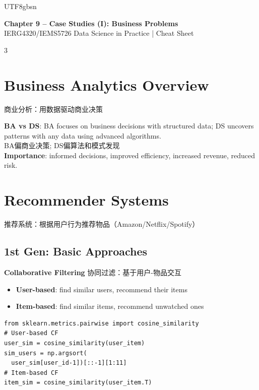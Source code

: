 \documentclass[9pt,landscape,a4paper]{article}
\newcommand{\zhint}[1]{{\scriptsize\color{gray!70!black}#1}}
\begin{document}
\begin{CJK}{UTF8}{gbsn}

\begin{center}
{\large\bfseries\color{blue!70!black} Chapter 9 -- Case Studies (I): Business Problems}\\
{\footnotesize IERG4320/IEMS5726 Data Science in Practice | Cheat Sheet}
\end{center}

\begin{multicols}{3}

\section{Business Analytics Overview}
\zhint{商业分析：用数据驱动商业决策}

\textbf{BA vs DS}: BA focuses on business decisions with structured data; DS uncovers patterns with any data using advanced algorithms.\\
\zhint{BA偏商业决策; DS偏算法和模式发现}\\
\textbf{Importance}: informed decisions, improved efficiency, increased revenue, reduced risk.

\section{Recommender Systems}
\zhint{推荐系统：根据用户行为推荐物品（Amazon/Netflix/Spotify）}

\subsection{1st Gen: Basic Approaches}

\textbf{Collaborative Filtering} \zhint{协同过滤：基于用户-物品交互}
\begin{itemize}[leftmargin=8pt,itemsep=0pt,topsep=0pt]
\item \textbf{User-based}: find similar users, recommend their items
\item \textbf{Item-based}: find similar items, recommend unwatched ones
\end{itemize}
\begin{lstlisting}
from sklearn.metrics.pairwise import cosine_similarity
# User-based CF
user_sim = cosine_similarity(user_item)
sim_users = np.argsort(
  user_sim[user_id-1])[::-1][1:11]
# Item-based CF
item_sim = cosine_similarity(user_item.T)
\end{lstlisting}


\end{multicols}
\end{CJK}
\end{document}
